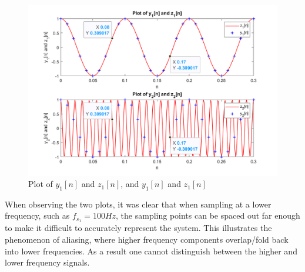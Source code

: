 \documentclass[a4paper, 10pt]{article}
\begin{document}
\begin{figure}[H]
  \centering
  \includegraphics[width=12cm]{images/q3_b.png}
  \caption{Plot of $y_1[n]$ and $z_1[n]$, and $y_1[n]$ and $z_1[n]$}
\end{figure}
When observing the two plots, it was clear that when sampling at a lower frequency, such as $f_{s_1} = 100Hz$,
the sampling points can be spaced out far enough to make it difficult to accurately represent the system. This
illustrates the phenomenon of aliasing, where higher frequency components overlap/fold back into lower frequencies.
As a result one cannot distinguish between the higher and lower frequency signals.

\hfill
\end{document}
